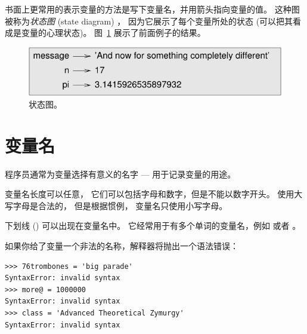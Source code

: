 书面上更常用的表示变量的方法是写下变量名，并用箭头指向变量的值。  
这种图被称为{\em 状态图} (state diagram) ， 
因为它展示了每个变量所处的状态 (可以把其看成是变量的心理状态)。  
图~\ref{fig.state2} 展示了前面例子的结果。

\begin{figure}
\centerline
{\includegraphics[scale=0.8]{../source/figs/state2.pdf}}
\caption{状态图。}
\label{fig.state2}
\end{figure}

\section{变量名}


程序员通常为变量选择有意义的名字 --- 用于记录变量的用途。

变量名长度可以任意， 它们可以包括字母和数字，但是不能以数字开头。 使用大写字母是合法的， 但是根据惯例， 变量名只使用小写字母。

下划线 (\li{_}) 可以出现在变量名中。 它经常用于有多个单词的变量名，例如  或者 。
 

如果你给了变量一个非法的名称，解释器将抛出一个语法错误：

\begin{lstlisting}
>>> 76trombones = 'big parade'
SyntaxError: invalid syntax
>>> more@ = 1000000
SyntaxError: invalid syntax
>>> class = 'Advanced Theoretical Zymurgy'
SyntaxError: invalid syntax
\end{lstlisting}

